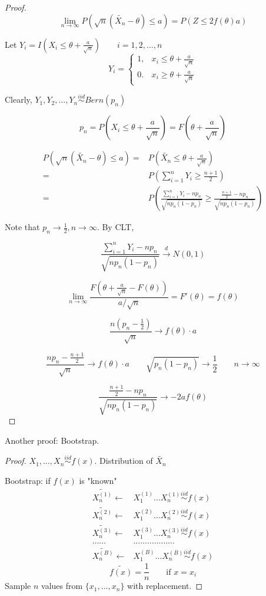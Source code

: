 \begin{proof}
\[\lim_{n \to\infty} P(\sqrt{n}(\tilde{X_n}-\theta)\leq a)=P(Z \leq 2 f(\theta)a)\]

Let $Y_i=I\left(X_i\leq \theta+\frac{a}{\sqrt{n}}\right) \qquad i=1,2,\dots,n$
\[Y_i=\begin{cases}
1, & x_i\leq \theta+\frac{a}{\sqrt{n}} \\
0. & x_i\geq \theta+\frac{a}{\sqrt{n}} 
\end{cases}\]

Clearly, $Y_1,Y_2,\dots,Y_n \overset{iid}{\sim} Bern(p_n)$

\[p_n=P\left(X_i\leq \theta+\frac{a}{\sqrt{n}}\right)=F\left( \theta+\frac{a}{\sqrt{n}}\right)\]

\begin{align*}
P(\sqrt{n}(\tilde{X_n}-\theta)\leq a)= & P\left(\tilde{X_n}\leq \theta+\frac{a}{\sqrt{n}}\right)\\
= & P\left( \sum_{i=1}^{n} Y_i \geq \frac{n+1}{2} \right) \\
= & P\left(\frac{\sum_{i=1}^{n} Y_i -n p_n}{\sqrt{n p_n(1-p_n)}} \geq \frac{\frac{n+1}{2} -n p_n}{\sqrt{n p_n(1-p_n)}}\right)
\end{align*}

Note that $p_n \to\frac{1}{2}, n\to \infty$. By CLT,

\[ \frac{\sum_{i=1}^{n} Y_i -n p_n}{\sqrt{n p_n(1-p_n)}}  \overset{d}{\to} N(0,1)\]

\[\lim_{n\to\infty} \frac{F\left(\theta+\frac{a}{\sqrt{n}}-F(\theta)\right)}{a/\sqrt{n}}=F'(\theta)=f(\theta)\]

\[\frac{n\left(p_n-\frac{1}{2}\right)}{\sqrt{n}} \longrightarrow f(\theta)\cdot a\]

\[\frac{np_n-\frac{n+1}{2}}{\sqrt{n}} \longrightarrow f(\theta)\cdot a \qquad \sqrt{p_n(1-p_n)} \longrightarrow \frac{1}{2} \qquad n\to\infty\]

\[\frac{\frac{n+1}{2} -n p_n}{\sqrt{n p_n(1-p_n)}}\longrightarrow -2af(\theta)\]
\end{proof}

Another proof: Bootstrap.
\begin{proof}
$X_1,\dots,X_n \overset{iid}{\sim} f(x)$. Distribution of $\tilde{X_n}$

Bootstrap: if $f(x)$ is "known"
\begin{align*}
\tilde{X_n^{(1)}} \leftarrow & X_1^{(1)} \dots X_n^{(1)} \overset{iid}{\sim} f(x)  \\
\tilde{X_n^{(2)}} \leftarrow & X_1^{(2)} \dots X_n^{(2)} \overset{iid}{\sim} f(x)  \\
\tilde{X_n^{(3)}} \leftarrow & X_1^{(3)} \dots X_n^{(3)} \overset{iid}{\sim} f(x)  \\
\dots\dots & \dots\dots\dots\dots\dots\dots \\
\tilde{X_n^{(B)}} \leftarrow & X_1^{(B)} \dots X_n^{(B)} \overset{iid}{\sim} f(x)  
\end{align*}
\[\tilde{f(x)}=\frac{1}{n} \qquad \text{if } x=x_i\]
Sample $n$ values from $\{x_1,\dots,x_n\}$ with replacement.
\end{proof}